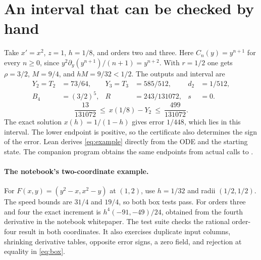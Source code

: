 \documentclass[11pt,letterpaper]{article}
\newcommand{\file}[1]{\texttt{\detokenize{#1}}}
\begin{document}
\section{An interval that can be checked by hand}
Take \(x'=x^2\), \(z=1\), \(h=1/8\), and orders two and three.
Here \(C_n(y)=y^{n+1}\) for every \(n\ge0\), since
\(y^2\partial_y(y^{n+1})/(n+1)=y^{n+2}\).
With \(r=1/2\) one gets \(\rho=3/2\), \(M=9/4\), and \(hM=9/32<1/2\).
The outputs and interval are
\begin{align*}
  Y_2=T_2&=73/64, &Y_3=T_3&=585/512, &d_2&=1/512,\\
  B_4&=(3/2)^5, &R&=243/131072, &s&=0.
\end{align*}
\begin{equation}\label{eq:example}
       \frac{13}{131072}\ \le\ x(1/8)-Y_2\ \le\ \frac{499}{131072}.
\end{equation}
The exact solution \(x(h)=1/(1-h)\) gives error \(1/448\), which lies in this
interval. The lower endpoint is positive, so the certificate also determines
the sign of the error. Lean derives \eqref{eq:example} directly from the
ODE and the starting state. The companion program obtains the same endpoints
from actual calls to \file{NomadSolver.step}.

\paragraph{The notebook's two-coordinate example.}
For \(F(x,y)=(y^2-x,x^2-y)\) at \((1,2)\), use \(h=1/32\) and radii
\((1/2,1/2)\). The speed bounds are \(31/4\) and \(19/4\), so both box
tests pass. For orders three and four the exact increment is
\(h^4(-91,-49)/24\), obtained from the fourth derivative in the notebook
whitepaper. The test suite checks the rational order-four result in both
coordinates. It also exercises duplicate input columns, shrinking derivative
tables, opposite error signs, a zero field, and rejection at equality in
\eqref{eq:box}.

\clearpage
\end{document}

